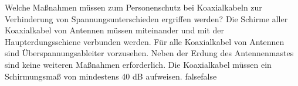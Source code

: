     {Welche Maßnahmen müssen zum Personenschutz bei Koaxialkabeln zur Verhinderung von Spannungsunterschieden ergriffen werden?}
    {Die Schirme aller Koaxialkabel von Antennen müssen miteinander und mit der Haupterdungsschiene verbunden werden.}
    {Für alle Koaxialkabel von Antennen sind Überspannungsableiter vorzusehen.}
    {Neben der Erdung des Antennenmastes sind keine weiteren Maßnahmen erforderlich.}
    {Die Koaxialkabel müssen ein Schirmungsmaß von mindestens 40 dB aufweisen.}
    {false}{false}
